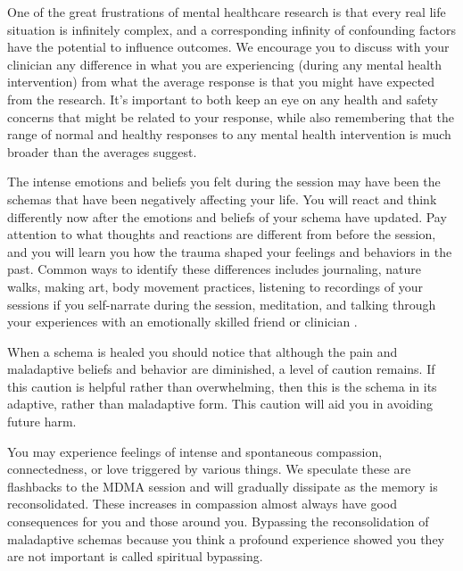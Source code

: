 \documentclass[12pt,letterpaper]{article}
\begin{document}
One of the great frustrations of mental healthcare research is that every real life situation is infinitely complex, and a corresponding infinity of confounding factors have the potential to influence outcomes. We encourage you to discuss with your clinician any difference in what you are experiencing (during any mental health intervention) from what the average response is that you might have expected from the research. It's important to both keep an eye on any health and safety concerns that might be related to your response, while also remembering that the range of normal and healthy responses to any mental health intervention is much broader than the averages suggest.

The intense emotions and beliefs you felt during the session may have been the schemas that have been negatively affecting your life. You will react and think differently now after the emotions and beliefs of your schema have updated. Pay attention to what thoughts and reactions are different from before the session, and you will learn you how the trauma shaped your feelings and behaviors in the past. Common ways to identify these differences includes journaling, nature walks, making art, body movement practices, listening to recordings of your sessions if you self-narrate during the session, meditation, and talking through your experiences with an emotionally skilled friend or clinician \cite{mithoeferManual}.

When a schema is healed you should notice that although the pain and maladaptive beliefs and behavior are diminished, a level of caution remains. If this caution is helpful rather than overwhelming, then this is the schema in its adaptive, rather than maladaptive form. This caution will aid you in avoiding future harm.

You may experience feelings of intense and spontaneous compassion, connectedness, or love triggered by various things. We speculate these are flashbacks to the MDMA session and will gradually dissipate as the memory is reconsolidated. These increases in compassion almost always have good consequences for you and those around you. Bypassing the reconsolidation of maladaptive schemas because you think a profound experience showed you they are not important is called spiritual bypassing. 
\end{document}

